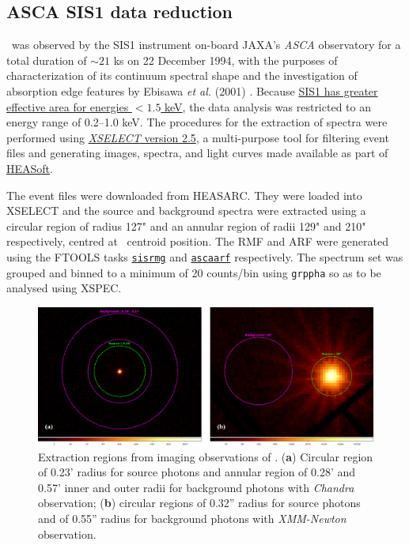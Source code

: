     \subsection{ASCA SIS1 data reduction}
    	\source\ was observed by the SIS1 instrument on-board JAXA's \textit{ASCA} observatory for a total duration of $\sim 21$ ks on 22 December 1994, with the purposes of characterization of its continuum spectral shape and the investigation of absorption edge features by Ebisawa \textit{et al.} (2001) \cite{ebisawaAsca2001ApJ}.
    	Because %
    	\href{https://heasarc.gsfc.nasa.gov/docs/asca/newsletters/sis_overview.html}{SIS1 has greater effective area for energies $<1.5$ keV}, the data analysis was restricted to an energy range of 0.2--1.0 keV. The procedures for the extraction of spectra were performed using %
    	\href{https://heasarc.gsfc.nasa.gov/ftools/xselect/}{\textit{XSELECT} version 2.5}, a multi-purpose tool for filtering event files and generating images, spectra, and light curves made available as part of \href{https://heasarc.gsfc.nasa.gov/docs/software/heasoft/}{HEASoft}.
    	
    	The event files were downloaded from HEASARC. They were loaded into XSELECT and the source and background spectra were extracted using a circular region of radius 127" and an annular region of radii 129" and 210" respectively, centred at \source\ centroid position. The RMF and ARF were generated using the FTOOLS tasks %
    	\href{https://heasarc.gsfc.nasa.gov/lheasoft/ftools/fhelp/sisrmg.html}{\texttt{sisrmg}} and %
    	\href{https://heasarc.gsfc.nasa.gov/lheasoft/ftools/fhelp/ascaarf.html}{\texttt{ascaarf}} respectively. The spectrum set was grouped and binned to a minimum of 20 counts/bin using \texttt{grppha} so as to be analysed using XSPEC.
    	
    	\begin{figure}[!htb]
	        \centering
	        \includegraphics[width=\textwidth]{figures/rx-j0925-7-4758_src-bkg}
	        \caption{Extraction regions from imaging observations of \source. (\textbf{a}) Circular region of 0.23' radius for source photons and annular region of 0.28' and 0.57' inner and outer radii for background photons with \textit{Chandra} observation; (\textbf{b}) circular regions of 0.32'' radius for source photons and of 0.55'' radius for background photons with \textit{XMM-Newton} observation.}
	        \label{fig:src-bkg}
	    \end{figure}
	    
